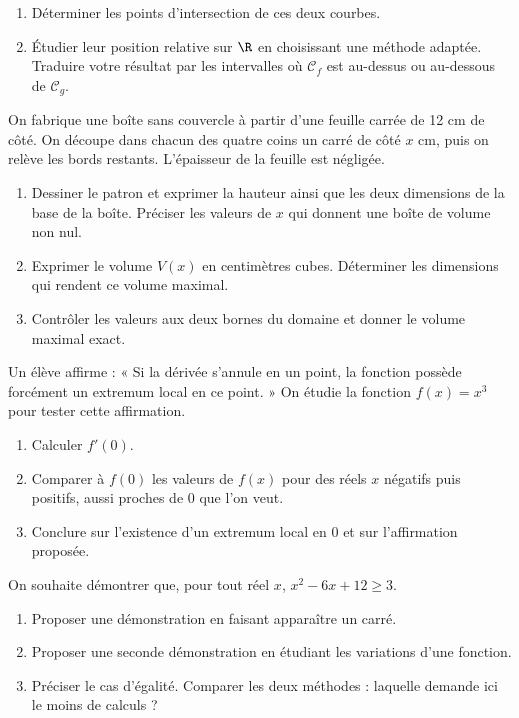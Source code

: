 \begin{enumerate}[label=\arabic*.]
\item Déterminer les points d’intersection de ces deux courbes.
\item Étudier leur position relative sur $\R$ en choisissant une méthode adaptée. Traduire votre résultat par les intervalles où $\mathcal C_f$ est au-dessus ou au-dessous de $\mathcal C_g$.
\end{enumerate}
On fabrique une boîte sans couvercle à partir d’une feuille carrée de 12 cm de côté. On découpe dans chacun des quatre coins un carré de côté $x$ cm, puis on relève les bords restants. L’épaisseur de la feuille est négligée.
\begin{enumerate}[label=\arabic*.]
\item Dessiner le patron et exprimer la hauteur ainsi que les deux dimensions de la base de la boîte. Préciser les valeurs de $x$ qui donnent une boîte de volume non nul.
\item Exprimer le volume $V(x)$ en centimètres cubes. Déterminer les dimensions qui rendent ce volume maximal.
\item Contrôler les valeurs aux deux bornes du domaine et donner le volume maximal exact.
\end{enumerate}

Un élève affirme : « Si la dérivée s’annule en un point, la fonction possède forcément un extremum local en ce point. » On étudie la fonction $f(x)=x^3$ pour tester cette affirmation.
\begin{enumerate}[label=\arabic*.]
\item Calculer $f\prime(0)$.
\item Comparer à $f(0)$ les valeurs de $f(x)$ pour des réels $x$ négatifs puis positifs, aussi proches de 0 que l’on veut.
\item Conclure sur l’existence d’un extremum local en 0 et sur l’affirmation proposée.
\end{enumerate}
On souhaite démontrer que, pour tout réel $x$, $x^2-6x+12\geq3$.
\begin{enumerate}[label=\arabic*.]
\item Proposer une démonstration en faisant apparaître un carré.
\item Proposer une seconde démonstration en étudiant les variations d’une fonction.
\item Préciser le cas d’égalité. Comparer les deux méthodes : laquelle demande ici le moins de calculs ?
\end{enumerate}
